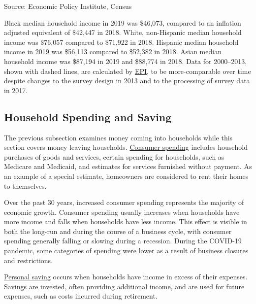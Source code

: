 \documentclass{report}
\begin{document}
{\begin{minipage}{0.37\textwidth}
\footnotesize{Source: Economic Policy Institute, Census} 
\end{minipage}\hspace{4mm}
\begin{minipage}{0.36\textwidth}
\small Black median household income in 2019 was \$46,073, compared to an inflation adjusted equivalent of \$42,447 in 2018. White, non-Hispanic median household income was \$76,057 compared to \$71,922 in 2018. Hispanic median household income in 2019 was \$56,113 compared to \$52,382 in 2018. Asian median household income was \$87,194 in 2019 and \$88,774 in 2018. Data for 2000--2013, shown with dashed lines, are calculated by \href{https://www.epi.org/blog/racial-and-ethnic-income-gaps-persist-amid-uneven-growth-in-household-incomes/}{EPI}, to be more-comparable over time despite changes to the survey design in 2013 and to the processing of survey data in 2017. 
\end{minipage}
\newpage 
\begin{minipage}{0.76\textwidth}
\subsection*{\color{black!70} \seriffont Household Spending and Saving}
\small The previous subsection examines money coming into households while this section covers money leaving households. \href{https://www.bea.gov/data/consumer-spending/main}{Consumer spending} includes household purchases of goods and services, certain spending for households, such as Medicare and Medicaid, and estimates for services furnished without payment. As an example of a special estimate, homeowners are considered to rent their homes to themselves. 

Over the past 30 years, increased consumer spending represents the majority of economic growth. Consumer spending usually increases when households have more income and falls when households have less income. This effect is visible in both the long-run and during the course of a business cycle, with consumer spending generally falling or slowing during a recession. During the COVID-19 pandemic, some categories of spending were lower as a result of business closures and restrictions.

\href{https://www.bea.gov/data/income-saving/personal-saving-rate}{Personal saving} occurs when households have income in excess of their expenses. Savings are invested, often providing additional income, and are used for future expenses, such as costs incurred during retirement.


\end{minipage}}
\end{document}
